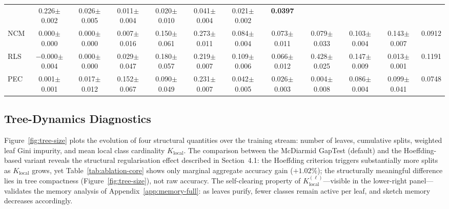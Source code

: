 \documentclass{article}
\newcommand{\arf}{\textsc{Arf}}
\begin{document}
\begin{table}[t]
{\begin{tabular}{lccccccccccc}
  & 0.226$\pm$0.002 & 0.026$\pm$0.005 & 0.011$\pm$0.004 & 0.020$\pm$0.010
  & 0.041$\pm$0.004 & 0.021$\pm$0.002 & \textbf{0.0397} \\
NCM
  & 0.000$\pm$0.000 & 0.000$\pm$0.000 & 0.007$\pm$0.016 & 0.150$\pm$0.061
  & 0.273$\pm$0.011 & 0.084$\pm$0.004 & 0.073$\pm$0.011 & 0.079$\pm$0.033
  & 0.103$\pm$0.004 & 0.143$\pm$0.007 & 0.0912 \\
RLS
  & $-$0.000$\pm$0.004 & 0.000$\pm$0.000 & 0.029$\pm$0.047 & 0.180$\pm$0.057
  & 0.219$\pm$0.007 & 0.109$\pm$0.006 & 0.066$\pm$0.012 & 0.428$\pm$0.025
  & 0.147$\pm$0.009 & 0.013$\pm$0.001 & 0.1191 \\
PEC
  & 0.001$\pm$0.001 & 0.017$\pm$0.012 & 0.152$\pm$0.067 & 0.090$\pm$0.049 & 0.231$\pm$0.007 & 0.042$\pm$0.005 & 0.026$\pm$0.003 & 0.004$\pm$0.008 & 0.086$\pm$0.004 & 0.099$\pm$0.041 & 0.0748 \\
\bottomrule
\end{tabular}}
\end{table}



\subsection{Tree-Dynamics Diagnostics}
\label{app:tree-dynamics}

Figure~\ref{fig:tree-size} plots the evolution of four structural quantities
over the training stream: number of leaves, cumulative splits, weighted leaf
Gini impurity, and mean local class cardinality $K_{\mathrm{local}}$. The
comparison between the McDiarmid GapTest (default) and the Hoeffding-based
variant reveals the structural regularisation effect described in Section~4.1:
the Hoeffding criterion triggers substantially more splits as $K_{\mathrm{local}}$
grows, 
yet Table~\ref{tab:ablation-core} shows only marginal aggregate accuracy
gain ($+1.02\%$); the structurally meaningful difference lies in tree
compactness (Figure~\ref{fig:tree-size}), not raw accuracy.
The self-clearing property
of $K_{\mathrm{local}}^{(\ell)}$---visible in the lower-right panel---validates
the memory analysis of Appendix~\ref{app:memory-full}: as leaves purify,
fewer classes remain active per leaf, and sketch memory decreases accordingly.
\end{document}
